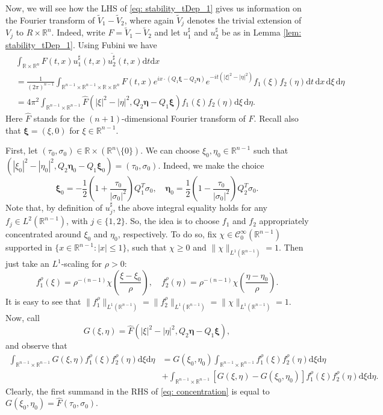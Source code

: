 \documentclass[10pt,a4paper]{amsart}
\theoremstyle{remark}
\theoremstyle{definition}
\newcommand{\R}{\mathbb{R}}
\newcommand{\dd}{\mathrm{d}}
\def\ovl{\overline}
\def\wt{\widetilde}
\def\bs{\boldsymbol}
\begin{document}
\vspace{0.2cm}

Now, we will see how the LHS of \eqref{eq: stability_tDep_1} gives us information on the Fourier transform of $\wt{V}_1-\wt{V}_2$, where again $\wt{V}_j$ denotes the trivial extension of $V_j$ to $R\times\R^n$. 
Indeed, write 
$F = \wt{V}_1 - \wt{V}_2 $ and let $u^\sharp_1$ and $u^\sharp_2$ be as in Lemma \ref{lem: stability_tDep_1}. Using Fubini we have
%
\[
\begin{aligned}
&\int_{\R\times\R^n} F(t,x)u^\sharp_1(t,x)\ovl{u^\sharp_2}(t,x)\dd t \dd x \\ 
%
&= \frac{1}{(2\pi)^{n-1}} \int_{\R^{n-1} \times \R^{n-1} \times \R \times \R^n} F(t,x)e^{ix\cdot(Q_1 \bs{\xi}-Q_2  \bs{\eta})}e^{-it(|\xi|^2-|\eta|^2)}f_1(\xi)f_2(\eta) \dd t\, \dd x\, \dd \xi \, \dd \eta \\
%
&= 4 \pi^2 \int_{\R^{n-1}\times\R^{n-1}} \widehat{F}(|\xi|^2-|\eta|^2, Q_2 \bs{\eta}-Q_1  \bs{\xi})f_1(\xi)f_2(\eta) \dd \xi\, \dd \eta.
\end{aligned}
\]
%
Here $\widehat F$ stands for the $(n+1)$-dimensional Fourier transform of $F$. Recall also that $\bs{\xi}=(\xi, 0)$ for $\xi \in \R^{n-1}$. 

First, let $(\tau_0, \sigma_0)\in \R\times\left(\R^n\setminus\{0\}\right)$. We can choose $\xi_0,\eta_0\in\R^{n-1}$ such that $(|\xi_0|^2-|\eta_0|^2,Q_2 \bs{\eta}_0 - Q_1\bs{\xi}_0)=(\tau_0,\sigma_0)$. Indeed, we make the choice
%
\[
\bs{\xi}_0=-\frac{1}{2}\left(1+\frac{\tau_0}{|\sigma_0|^2}\right)Q_1^T\sigma_0, \quad   \bs{\eta}_0=\frac{1}{2}\left(1-\frac{\tau_0}{|\sigma_0|^2}\right)Q_2^T\sigma_0.
\]
%
Note that, by definition of $u_j^\sharp$, the above integral equality holds for any $f_j\in L^2(\R^{n-1})$, with $j\in\{1, 2\}$. So, the idea is to choose $f_1$ and $f_2$ appropriately concentrated around $\xi_0$ and $\eta_0$, respectively. To do so, fix $\chi\in \mathcal C_0^\infty(\R^{n-1})$ supported in $\{x\in\R^{n-1}:|x|\leq 1\}$, such that $\chi\geq0$ and $\|\chi\|_{L^1(\R^{n-1})}=1$. Then just take an $L^1$-scaling for $\rho>0$:
%
\[
f_1^\rho(\xi) = \rho^{-(n-1)}\chi\left(\frac{\xi-\xi_0}{\rho}\right),\quad f_2^\rho(\eta) = \rho^{-(n-1)}\chi\left(\frac{\eta-\eta_0}{\rho}\right).
\]
%
It is easy to see that $\| f^\rho_1\|_{L^1(\R^{n-1})}=\| f^\rho_2\|_{L^1(\R^{n-1})}=\|\chi\|_{L^1(\R^{n-1})}=1$. Now, call 
%
\[
G( \xi,  \eta)=\widehat{F}(|\xi|^2-|\eta|^2, Q_2  \bs{\eta}-Q_1 \bs{\xi}),
\] 
%
and observe that
%
\begin{equation}\label{eq: concentration}
	\begin{aligned}
	\int_{\R^{n-1}\times\R^{n-1}}G(\xi, \eta)f_1^\rho (\xi)f_2^\rho(\eta) \dd \xi\dd \eta &= G(\xi_0,\eta_0)\int_{\R^{n-1}\times\R^{n-1}}f_1^\rho (\xi)f_2^\rho(\eta) \dd \xi \dd \eta \\
	&+ \int_{\R^{n-1}\times\R^{n-1}}\left[G(\xi,\eta)-G(\xi_0,\eta_0)\right] f_1^\rho (\xi)f_2^\rho(\eta) \dd \xi \dd \eta.
	\end{aligned}
\end{equation}
%
Clearly, the first summand in the RHS of \eqref{eq: concentration} is equal to $G(\xi_0,\eta_0)=\widehat F(\tau_0,\sigma_0)$. 
\end{document}
